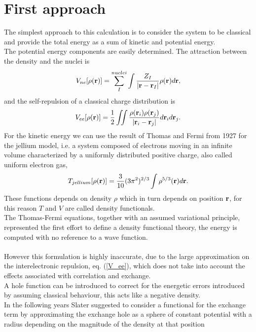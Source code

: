 \section{First approach}
The simplest approach to this calculation is to consider the system to be classical and provide the total energy as a sum of kinetic and potential energy. \\
The potential energy components are easily determined. The attraction between the density and the nuclei is
\begin{equation}
    V_{ne} [\rho({\bf r})] = \sum_I^{nuclei} \int \frac{Z_I}{|{\bf r} - {\bf r}_I|}\rho({\bf r})d{\bf r},
\end{equation}
and the self-repulsion of a classical charge distribution is
\begin{equation}
    V_{ee} [\rho({\bf r})] = \frac{1}{2} \iint\frac{\rho({\bf r}_i) \rho({\bf r}_j)}{|{\bf r}_i - {\bf r}_j|} d{\bf r}_i d{\bf r}_j. \label{V_ee}
\end{equation}
For the kinetic energy we can use the result of Thomas and Fermi from 1927 for the jellium model, i.e. a system composed of electrons moving in an infinite volume characterized by a uniformly distributed positive charge, also called uniform electron gas,
\begin{equation}
    T_{jellium} [\rho({\bf r})] = \frac{3}{10}(3\pi^2)^{2/3} \int \rho^{5/3}({\bf r}) d{\bf r}.
\end{equation}
These functions depends on density $\rho$ which in turn depends on position $\bf r$, for this reason $T$ and $V$ are called density functionals. \\
The Thomas-Fermi equations, together with an assumed variational principle, represented the first effort to define a density functional theory, the energy is computed with no reference to a wave function. \\
\\
However this formulation is highly inaccurate, due to the large approximation on the interelectronic repulsion, eq. (\ref{V_ee}), which does not take into account the effects associated with correlation and exchange. \\
A hole function can be introduced to correct for the energetic errors introduced by assuming classical behaviour, this acts like a negative density. \\
In the following years Slater suggested to consider a functional for the exchange term by approximating the exchange hole as a sphere of constant potential with a radius depending on the magnitude of the density at that position
